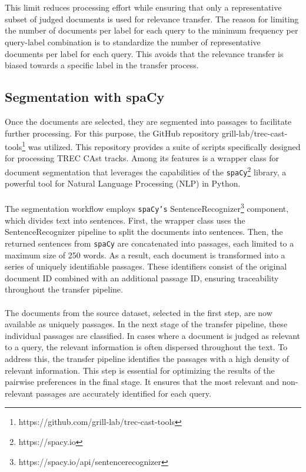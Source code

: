 \\\\
This limit reduces processing effort while ensuring that only a representative subset of judged documents is used for relevance transfer. The reason for limiting the number of documents per label for each query to the minimum frequency per query-label combination is to standardize the number of representative documents per label for each query. This avoids that the relevance transfer is biased towards a specific label in the transfer process.

\subsection{Segmentation with spaCy}\label{segmentation-with-spacy}

Once the documents are selected, they are segmented into passages to facilitate further processing. For this purpose, the GitHub repository grill-lab/trec-cast-tools\footnote{https://github.com/grill-lab/trec-cast-tools} was utilized. This repository provides a suite of scripts specifically designed for processing TREC CAst tracks. Among its features is a wrapper class for document segmentation that leverages the capabilities of the \texttt{spaCy}\footnote{https://spacy.io} library, a powerful tool for Natural Language Processing (NLP) in Python.
\\\\
The segmentation workflow employs \texttt{spaCy's} SentenceRecognizer\footnote{https://spacy.io/api/sentencerecognizer} component, which divides text into sentences. First, the wrapper class uses the SentenceRecognizer pipeline to split the documents into sentences. Then, the returned sentences from \texttt{spaCy} are concatenated into passages, each limited to a maximum size of 250 words. As a result, each document is transformed into a series of uniquely identifiable passages. These identifiers consist of the original document ID combined with an additional passage ID, ensuring traceability throughout the transfer pipeline.
\\\\
The documents from the source dataset, selected in the first step, are now available as uniquely passages. In the next stage of the transfer pipeline, these individual passages are classified. In cases where a document is judged as relevant to a query, the relevant information is often dispersed throughout the text. To address this, the transfer pipeline identifies the passages with a high density of relevant information. This step is essential for optimizing the results of the pairwise preferences in the final stage. It ensures that the most relevant and non-relevant passages are accurately identified for each query.



